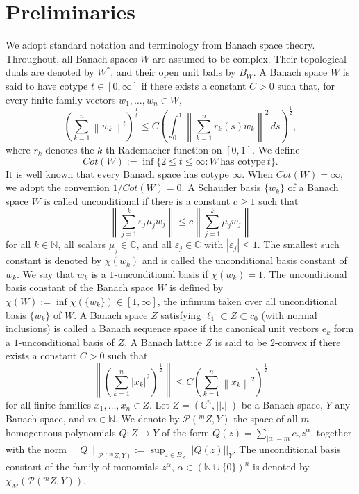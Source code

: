 \documentclass[a4paper,11pt, reqno]{amsart}
\theoremstyle{definition}
\newcounter {own}
\newcommand{\norm}[1]{\left\lVert#1\right\rVert}
\begin{document}
	\section{Preliminaries}
	We adopt standard notation and terminology from Banach space theory. Throughout, all Banach spaces $W$ are assumed to be complex. Their topological duals are denoted by $W^{*}$, and their open unit balls by $B_{W}$. A Banach space $W$ is said to have cotype $t\in [0,\infty]$ if there exists a constant $C>0$ such that, for every finite family vectors $w_{1},\ldots,w_{n}\in W$, 
	$$\left(\sum_{k=1}^{n}\norm{w_{k}}^t\right)^{\frac{1}{t}} \leq C \left(\int_{0}^{1}\norm{\sum_{k=1}^{n}r_{k}(s)w_{k}}^2\, ds\right)^{\frac{1}{2}},$$
	where $r_{k}$ denotes the $k$-th Rademacher function on $[0,1]$. We define 
	$$Cot(W):=\inf\{2 \leq t \leq \infty: W\, \mbox{has cotype}\, t\}.
	$$
	It is well known that every Banach space has cotype $\infty$.  When $Cot(W)=\infty$,  we adopt the convention $1/Cot(W)=0$. A Schauder basis $\{w_{k}\}$ of a Banach space $W$ is called unconditional if there is a constant $c\geq 1$ such that $$\norm{\sum_{j=1}^{k}\varepsilon_{j}\mu_{j}w_{j}} \leq c \norm{\sum_{j=1}^{k}\mu_{j}w_{j}}
	$$
	for all $k\in\mathbb{N}$, all scalars $\mu_{j}\in\mathbb{C}$, and all $\varepsilon_{j}\in\mathbb{C}$ with $|\varepsilon_{j}|\le 1$. The smallest such constant is denoted by $\chi({w_{k}})$ and is called the unconditional basis constant of ${w_{k}}$. We say that ${w_{k}}$ is a $1$-unconditional basis if $\chi({w_{k}})=1$. The unconditional basis constant of the Banach space $W$ is defined by $\chi(W):=\inf \chi(\{w_{k}\})\in [1,\infty]$, the infimum taken over all unconditional basis $\{w_{k}\}$ of $W$. A Banach space $Z$ satisfying $\ell_1 \subset Z \subset c_{0}$ (with normal inclusions) is called a Banach sequence space if the canonical unit vectors ${e_{k}}$ form a $1$-unconditional basis of $Z$. A Banach lattice $Z$ is said to be $2$-convex if there exists a constant $C>0$ such that 
	$$\norm{\left(\sum_{k=1}^{n}|x_{k}|^2\right)^{\frac{1}{2}}} \leq C 	\left(\sum_{k=1}^{n}\norm{x_{k}}^2\right)^{\frac{1}{2}}
	$$
	for all finite families $x_{1},\ldots,x_{n}\in Z$. Let $Z=(\mathbb{C}^n, ||.||)$ be a Banach space, $Y$ any Banach space, and $m \in \mathbb{N}$. We denote by $\mathcal{P}(^m Z,Y)$ the space of all $m$-homogeneous polynomials $Q:Z \rightarrow Y$ of the form $Q(z)=\sum_{|\alpha|=m}c_{\alpha}z^{\alpha}$, together with the norm $\norm{Q}_{\mathcal{P}(^m Z,Y)}:=\sup_{z \in B_{Z}}||Q(z)||_{Y}$. The unconditional basis constant of the family of monomials $z^{\alpha}$, $\alpha \in (\mathbb{N} \cup \{0\})^n$ is denoted by $\chi_{M}(\mathcal{P}(^m Z,Y))$.
\end{document}
